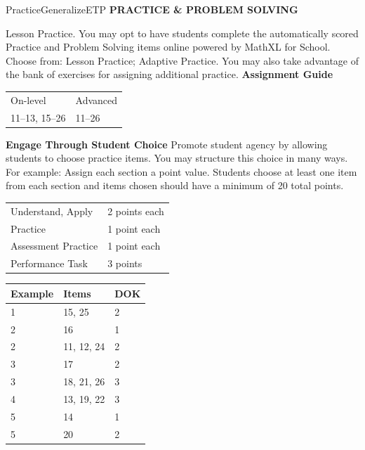 \documentclass{article}
\newenvironment{item-analysis}{}{}      %
\newenvironment{te-addendum}[2]{}{}     %
\newcommand{\te}[1]{}                   %
\begin{document}
\begin{te-addendum}{Practice}{GeneralizeETP}
\textbf{PRACTICE \& PROBLEM SOLVING}
\te{Practice. Practice \& Problem Solving and video tutorials are available at SavvasRealize.com. Scan the QR code to access a video tutorial.}
Lesson Practice. You may opt to have students complete the automatically scored Practice and Problem Solving items online powered by MathXL for School.
Choose from: Lesson Practice; Adaptive Practice.
You may also take advantage of the bank of exercises for assigning additional practice.
\textbf{Assignment Guide}
\begin{tabular}{ll}
On-level & Advanced \\
11--13, 15--26 & 11--26 \\
\end{tabular}
\textbf{Engage Through Student Choice}
Promote student agency by allowing students to choose practice items.
You may structure this choice in many ways. For example:
Assign each section a point value. Students choose at least one item from each section and items chosen should have a minimum of 20 total points.
\begin{tabular}{ll}
Understand, Apply & 2 points each \\
Practice & 1 point each \\
Assessment Practice & 1 point each \\
Performance Task & 3 points \\
\end{tabular}
\end{te-addendum}
\begin{item-analysis}
\begin{tabular}{lll}
\toprule
Example & Items & DOK \\
\midrule
1 & 15, 25 & 2 \\
2 & 16 & 1 \\
2 & 11, 12, 24 & 2 \\
3 & 17 & 2 \\
3 & 18, 21, 26 & 3 \\
4 & 13, 19, 22 & 3 \\
5 & 14 & 1 \\
5 & 20 & 2 \\
\bottomrule
\end{tabular}
\end{item-analysis}
\end{document}
